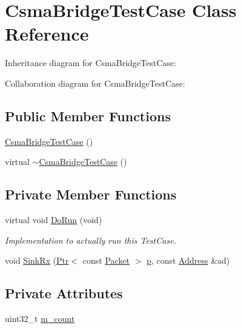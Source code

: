\hypertarget{classCsmaBridgeTestCase}{}\section{Csma\+Bridge\+Test\+Case Class Reference}
\label{classCsmaBridgeTestCase}


Inheritance diagram for Csma\+Bridge\+Test\+Case\+:


Collaboration diagram for Csma\+Bridge\+Test\+Case\+:
\subsection*{Public Member Functions}
\begin{DoxyCompactItemize}
\item 
\hyperlink{classCsmaBridgeTestCase_a66522141fbfe1b9dd199f299bb343fa5}{Csma\+Bridge\+Test\+Case} ()
\item 
virtual \hyperlink{classCsmaBridgeTestCase_a38bd951676fba8b231551f125cf8bb4e}{$\sim$\+Csma\+Bridge\+Test\+Case} ()
\end{DoxyCompactItemize}
\subsection*{Private Member Functions}
\begin{DoxyCompactItemize}
\item 
virtual void \hyperlink{classCsmaBridgeTestCase_a418aed79734ecaf7b1d0be507ff3d580}{Do\+Run} (void)
\begin{DoxyCompactList}\small\item\em Implementation to actually run this Test\+Case. \end{DoxyCompactList}\item 
void \hyperlink{classCsmaBridgeTestCase_a9f2304977a0bc24c5ae592d222ecbbca}{Sink\+Rx} (\hyperlink{classns3_1_1Ptr}{Ptr}$<$ const \hyperlink{classns3_1_1Packet}{Packet} $>$ \hyperlink{lte__link__budget__x2__handover__measures_8m_ac9de518908a968428863f829398a4e62}{p}, const \hyperlink{classns3_1_1Address}{Address} \&ad)
\end{DoxyCompactItemize}
\subsection*{Private Attributes}
\begin{DoxyCompactItemize}
\item 
uint32\+\_\+t \hyperlink{classCsmaBridgeTestCase_a635c9dbf3859a6b4f6097aa996548006}{m\+\_\+count}
\end{DoxyCompactItemize}
